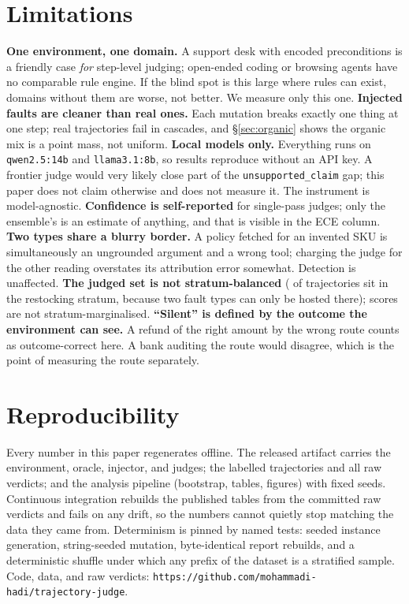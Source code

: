 \documentclass{article}
\newcommand{\ftype}[1]{\texttt{#1}}
\begin{document}
\section{Limitations}
\label{sec:limitations}

\textbf{One environment, one domain.} A support desk with encoded preconditions is a friendly
case \emph{for} step-level judging; open-ended coding or browsing agents have no comparable
rule engine. If the blind spot is this large where rules can exist, domains without them are
worse, not better. We measure only this one.
\textbf{Injected faults are cleaner than real ones.} Each mutation breaks exactly one thing
at one step; real trajectories fail in cascades, and \S\ref{sec:organic} shows the organic
mix is a point mass, not uniform.
\textbf{Local models only.} Everything runs on \texttt{qwen2.5:14b} and
\texttt{llama3.1:8b}, so results reproduce without an API key. A frontier judge would very
likely close part of the \ftype{unsupported\_claim} gap; this paper does not claim otherwise
and does not measure it. The instrument is model-agnostic.
\textbf{Confidence is self-reported} for single-pass judges; only the ensemble's is an
estimate of anything, and that is visible in the ECE column.
\textbf{Two types share a blurry border.} A policy fetched for an invented SKU is
simultaneously an ungrounded argument and a wrong tool; charging the judge for the other
reading overstates its attribution error somewhat. Detection is unaffected.
\textbf{The judged set is not stratum-balanced} (\tjNRestocking{} of \tjNTraj{} trajectories
sit in the restocking stratum, because two fault types can only be hosted there); scores are
not stratum-marginalised.
\textbf{``Silent'' is defined by the outcome the environment can see.} A refund of the right
amount by the wrong route counts as outcome-correct here. A bank auditing the route would
disagree, which is the point of measuring the route separately.

\section{Reproducibility}
\label{sec:repro}

Every number in this paper regenerates offline. The released artifact carries the
environment, oracle, injector, and judges; the \tjNTraj{} labelled trajectories and all
\tjNVerdicts{} raw verdicts; and the analysis pipeline (bootstrap, tables, figures) with
fixed seeds. Continuous integration rebuilds the published tables from the committed raw
verdicts and fails on any drift, so the numbers cannot quietly stop matching the data they
came from. Determinism is pinned by named tests: seeded instance generation, string-seeded
mutation, byte-identical report rebuilds, and a deterministic shuffle under which any prefix
of the dataset is a stratified sample. Code, data, and raw verdicts:
\texttt{https://github.com/mohammadi-hadi/trajectory-judge}.




\clearpage
\appendix

\end{document}
